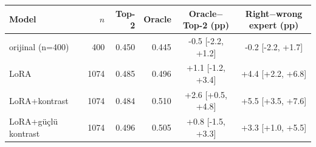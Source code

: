 \begin{tabular}{lrrrcc}
\toprule
Model & $n$ & Top-2 & Oracle & Oracle$-$Top-2 (pp) & Right$-$wrong expert (pp) \\
\midrule
orijinal (n=400) & 400 & 0.450 & 0.445 & -0.5 [-2.2, +1.2] & -0.2 [-2.2, +1.7] \\
LoRA & 1074 & 0.485 & 0.496 & +1.1 [-1.2, +3.4] & +4.4 [+2.2, +6.8] \\
LoRA+kontrast & 1074 & 0.484 & 0.510 & +2.6 [+0.5, +4.8] & +5.5 [+3.5, +7.6] \\
LoRA+güçlü kontrast & 1074 & 0.496 & 0.505 & +0.8 [-1.5, +3.3] & +3.3 [+1.0, +5.5] \\
\bottomrule
\end{tabular}
